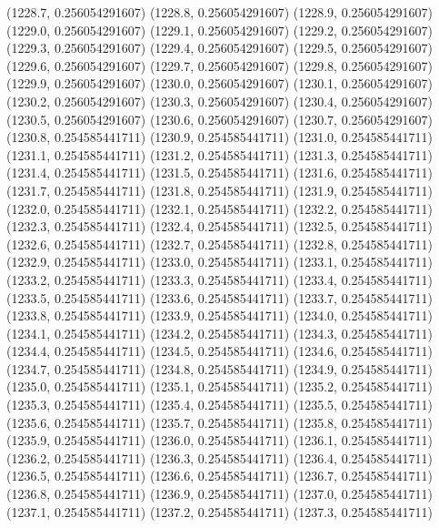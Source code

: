 {					(1228.7, 0.256054291607)
					(1228.8, 0.256054291607)
					(1228.9, 0.256054291607)
					(1229.0, 0.256054291607)
					(1229.1, 0.256054291607)
					(1229.2, 0.256054291607)
					(1229.3, 0.256054291607)
					(1229.4, 0.256054291607)
					(1229.5, 0.256054291607)
					(1229.6, 0.256054291607)
					(1229.7, 0.256054291607)
					(1229.8, 0.256054291607)
					(1229.9, 0.256054291607)
					(1230.0, 0.256054291607)
					(1230.1, 0.256054291607)
					(1230.2, 0.256054291607)
					(1230.3, 0.256054291607)
					(1230.4, 0.256054291607)
					(1230.5, 0.256054291607)
					(1230.6, 0.256054291607)
					(1230.7, 0.256054291607)
					(1230.8, 0.254585441711)
					(1230.9, 0.254585441711)
					(1231.0, 0.254585441711)
					(1231.1, 0.254585441711)
					(1231.2, 0.254585441711)
					(1231.3, 0.254585441711)
					(1231.4, 0.254585441711)
					(1231.5, 0.254585441711)
					(1231.6, 0.254585441711)
					(1231.7, 0.254585441711)
					(1231.8, 0.254585441711)
					(1231.9, 0.254585441711)
					(1232.0, 0.254585441711)
					(1232.1, 0.254585441711)
					(1232.2, 0.254585441711)
					(1232.3, 0.254585441711)
					(1232.4, 0.254585441711)
					(1232.5, 0.254585441711)
					(1232.6, 0.254585441711)
					(1232.7, 0.254585441711)
					(1232.8, 0.254585441711)
					(1232.9, 0.254585441711)
					(1233.0, 0.254585441711)
					(1233.1, 0.254585441711)
					(1233.2, 0.254585441711)
					(1233.3, 0.254585441711)
					(1233.4, 0.254585441711)
					(1233.5, 0.254585441711)
					(1233.6, 0.254585441711)
					(1233.7, 0.254585441711)
					(1233.8, 0.254585441711)
					(1233.9, 0.254585441711)
					(1234.0, 0.254585441711)
					(1234.1, 0.254585441711)
					(1234.2, 0.254585441711)
					(1234.3, 0.254585441711)
					(1234.4, 0.254585441711)
					(1234.5, 0.254585441711)
					(1234.6, 0.254585441711)
					(1234.7, 0.254585441711)
					(1234.8, 0.254585441711)
					(1234.9, 0.254585441711)
					(1235.0, 0.254585441711)
					(1235.1, 0.254585441711)
					(1235.2, 0.254585441711)
					(1235.3, 0.254585441711)
					(1235.4, 0.254585441711)
					(1235.5, 0.254585441711)
					(1235.6, 0.254585441711)
					(1235.7, 0.254585441711)
					(1235.8, 0.254585441711)
					(1235.9, 0.254585441711)
					(1236.0, 0.254585441711)
					(1236.1, 0.254585441711)
					(1236.2, 0.254585441711)
					(1236.3, 0.254585441711)
					(1236.4, 0.254585441711)
					(1236.5, 0.254585441711)
					(1236.6, 0.254585441711)
					(1236.7, 0.254585441711)
					(1236.8, 0.254585441711)
					(1236.9, 0.254585441711)
					(1237.0, 0.254585441711)
					(1237.1, 0.254585441711)
					(1237.2, 0.254585441711)
					(1237.3, 0.254585441711)
}

